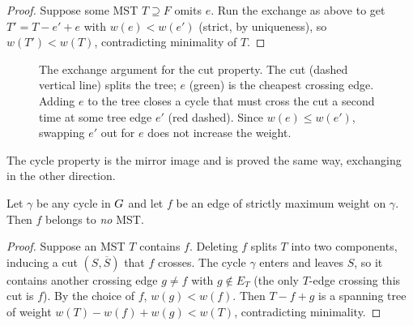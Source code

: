 \begin{proof}
Suppose some MST $T\supseteq F$ omits $e$. Run the exchange as above to get $T'=T-e'+e$ with $w(e)<w(e')$ (strict, by uniqueness), so $w(T')<w(T)$, contradicting minimality of $T$.
\end{proof}

\begin{figure}[H]
\centering
{}
\caption{The exchange argument for the cut property. The cut (dashed vertical line) splits the tree; $e$ (green) is the cheapest crossing edge. Adding $e$ to the tree closes a cycle that must cross the cut a second time at some tree edge $e'$ (red dashed). Since $w(e)\le w(e')$, swapping $e'$ out for $e$ does not increase the weight.}
\label{ch06:cut-exchange}
\end{figure}

The cycle property is the mirror image and is proved the same way, exchanging in the other direction.

\begin{theorem}
\label{ch06:cycle-property}
Let $\gamma$ be any cycle in $G$ and let $f$ be an edge of strictly maximum weight on $\gamma$. Then $f$ belongs to \emph{no} MST.
\end{theorem}

\begin{proof}
Suppose an MST $T$ contains $f$. Deleting $f$ splits $T$ into two components, inducing a cut $(S,\overline S)$ that $f$ crosses. The cycle $\gamma$ enters and leaves $S$, so it contains another crossing edge $g\ne f$ with $g\notin E_T$ (the only $T$-edge crossing this cut is $f$). By the choice of $f$, $w(g)<w(f)$. Then $T-f+g$ is a spanning tree of weight $w(T)-w(f)+w(g)<w(T)$, contradicting minimality.
\end{proof}

